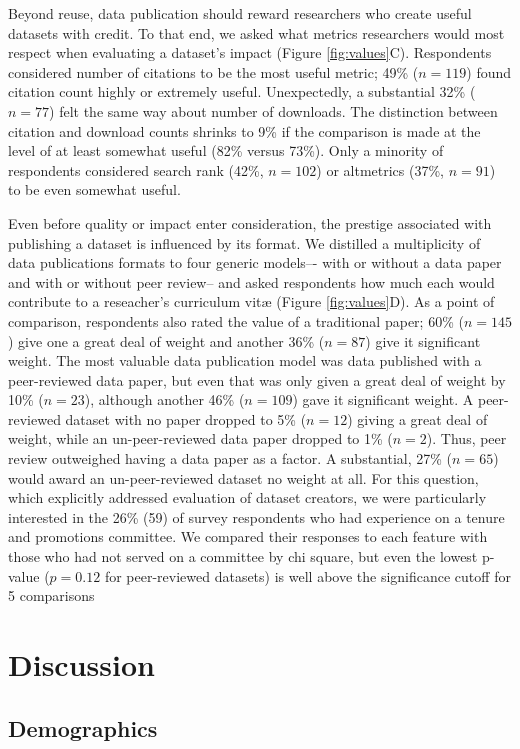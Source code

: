\documentclass[10pt]{article}
\begin{document}
Beyond reuse, data publication should reward researchers who create useful datasets with credit.
To that end, we asked what metrics researchers would most respect when evaluating a dataset's impact (Figure \ref{fig:values}C).
Respondents considered number of citations to be the most useful metric; 49\% ($n=119$) found citation count highly or extremely useful. 
Unexpectedly, a substantial 32\% ($n=77$) felt the same way about number of downloads.
The distinction between citation and download counts shrinks to 9\% if the comparison is made at the level of at least somewhat useful (82\% versus 73\%).
Only a minority of respondents considered search rank (42\%, $n=102$) or altmetrics (37\%, $n=91$) to be even somewhat useful.

Even before quality or impact enter consideration, the prestige associated with publishing a dataset is influenced by its format.
We distilled a multiplicity of data publications formats to four generic models–- with or without a data paper and with or without peer review-- and asked respondents how much each would contribute to a reseacher's curriculum vit{\ae} (Figure \ref{fig:values}D).
As a point of comparison, respondents also rated the value of a traditional paper; 60\% ($n=145$) give one a great deal of weight and another 36\% ($n=87$) give it significant weight.
The most valuable data publication model was data published with a peer-reviewed data paper, but even that was only given a great deal of weight by 10\% ($n=23$), although another 46\% ($n=109$) gave it significant weight.
A peer-reviewed dataset with no paper dropped to 5\% ($n=12$) giving a great deal of weight, while an un-peer-reviewed data paper dropped to 1\% ($n=2$).
Thus, peer review outweighed having a data paper as a factor. 
A substantial, 27\% ($n=65$) would award an un-peer-reviewed dataset no weight at all.
For this question, which explicitly addressed evaluation of dataset creators, we were particularly interested in the 26\% (59) of survey respondents who had experience on a tenure and promotions committee.
We compared their responses to each feature with those who had not served on a committee by chi square, but even the lowest p-value ($p= 0.12$ for peer-reviewed datasets) is well above the significance cutoff for 5 comparisons

\section*{Discussion}

\subsection*{Demographics}
\end{document}
